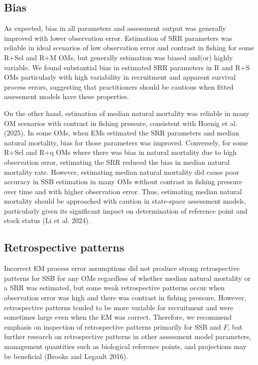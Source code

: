 \documentclass[
  12pt,
]{article}
\begin{document}
\hypertarget{bias-2}{%
\subsection*{Bias}\label{bias-2}}

As expected, bias in all parameters and assessment output was generally
improved with lower observation error. Estimation of SRR parameters was
reliable in ideal scenarios of low observation error and contrast in
fishing for some R+Sel and R+M OMs, but generally estimation was biased
and(or) highly variable. We found substantial bias in estimated SRR
parameters in R and R+S OMs particularly with high variability in
recruitment and apparent survival process errors, suggesting that
practitioners should be cautious when fitted assessment models have
these properties.

On the other hand, estimation of median natural mortality was reliable
in many OM scenarios with contrast in fishing pressure, consistent with
Hoenig et al. (2025). In some OMs, when EMs estimated the SRR parameters
and median natural mortality, bias for those parameters was improved.
Conversely, for some R+Sel and R+q OMs where there was bias in natural
mortality due to high observation error, estimating the SRR reduced the
bias in median natural mortality rate. However, estimating median
natural mortality did cause poor accuracy in SSB estimation in many OMs
without contrast in fishing pressure over time and with higher
observation error. Thus, estimating median natural mortality should be
approached with caution in state-space assessment models, particularly
given its significant impact on determination of reference point and
stock status (Li et al. 2024).

\hypertarget{retrospective-patterns}{%
\subsection*{Retrospective patterns}\label{retrospective-patterns}}

Incorrect EM process error assumptions did not produce strong
retrospective patterns for SSB for any OMs regardless of whether median
natural mortality or a SRR was estimated, but some weak retrospective
patterns occur when observation error was high and there was contrast in
fishing pressure. However, retrospective patterns tended to be more
variable for recruitment and were sometimes large even when the EM was
correct. Therefore, we recommend emphasis on inspection of retrospective
patterns primarily for SSB and \(F\), but further research on
retrospective patterns in other assessment model parameters, management
quantities such as biological reference points, and projections may be
beneficial (Brooks and Legault 2016).
\end{document}
